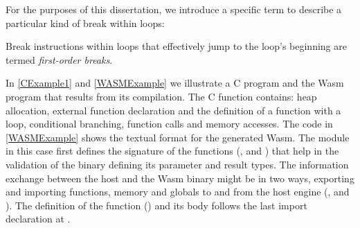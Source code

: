 For the purposes of this dissertation, we introduce a specific term to describe a particular kind of break within loops:

\begin{definition}\label{first_order_jump}
Break instructions within loops that effectively jump to the loop's beginning are termed \emph{first-order breaks}.
\end{definition}




In \autoref{CExample1} and \autoref{WASMExample} we illustrate a C program and the Wasm program that results from its compilation. 
The C function contains: heap allocation, external function declaration and the definition of a function with a loop, conditional branching, function calls and memory accesses. 
The code in \autoref{WASMExample} shows the textual format for the generated Wasm. 
The module in this case first defines the signature of the functions (,   and  )  that help in the validation of the binary defining its parameter and result types. The information exchange between the host and the Wasm  binary might be in two ways, exporting and importing functions, memory and globals to and from the host engine (,  and ). The definition of the function () and its body follows the last import declaration at . 


